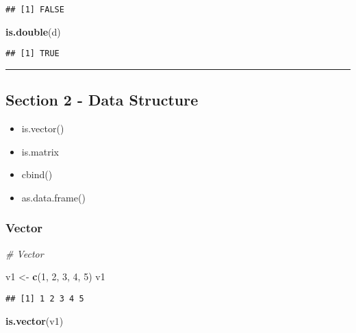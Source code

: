 \documentclass[
]{article}
\newenvironment{Shaded}{\begin{snugshade}}{\end{snugshade}}
\newcommand{\CommentTok}[1]{\textcolor[rgb]{0.56,0.35,0.01}{\textit{#1}}}
\newcommand{\DecValTok}[1]{\textcolor[rgb]{0.00,0.00,0.81}{#1}}
\newcommand{\FunctionTok}[1]{\textcolor[rgb]{0.13,0.29,0.53}{\textbf{#1}}}
\newcommand{\NormalTok}[1]{#1}
\newcommand{\OtherTok}[1]{\textcolor[rgb]{0.56,0.35,0.01}{#1}}
\providecommand{\tightlist}{%
  \setlength{\itemsep}{0pt}\setlength{\parskip}{0pt}}
\begin{document}
\begin{verbatim}
## [1] FALSE
\end{verbatim}

\begin{Shaded}
\begin{Highlighting}[]
\FunctionTok{is.double}\NormalTok{(d)}
\end{Highlighting}
\end{Shaded}

\begin{verbatim}
## [1] TRUE
\end{verbatim}

\begin{center}\rule{0.5\linewidth}{0.5pt}\end{center}

\subsection{Section 2 - Data
Structure}\label{section-2---data-structure}

\begin{itemize}
\tightlist
\item
  is.vector()
\item
  is.matrix
\item
  cbind()
\item
  as.data.frame()
\end{itemize}

\subsubsection{Vector}\label{vector}

\begin{Shaded}
\begin{Highlighting}[]
\CommentTok{\# Vector}

\NormalTok{v1 }\OtherTok{\textless{}{-}} \FunctionTok{c}\NormalTok{(}\DecValTok{1}\NormalTok{, }\DecValTok{2}\NormalTok{, }\DecValTok{3}\NormalTok{, }\DecValTok{4}\NormalTok{, }\DecValTok{5}\NormalTok{)}
\NormalTok{v1}
\end{Highlighting}
\end{Shaded}

\begin{verbatim}
## [1] 1 2 3 4 5
\end{verbatim}

\begin{Shaded}
\begin{Highlighting}[]
\FunctionTok{is.vector}\NormalTok{(v1)}
\end{Highlighting}
\end{Shaded}
\end{document}
